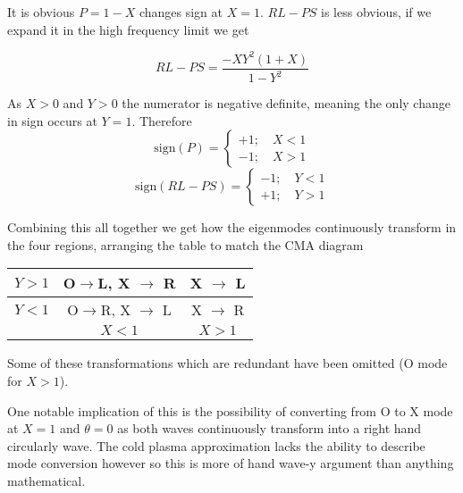 \documentclass[12pt, twoside]{article}
\begin{document}
	It is obvious $P = 1 - X$ changes sign at $X = 1$. $RL - PS$ is less obvious, if we expand it in the high frequency limit we get
	
	\begin{equation}
		RL - PS = \frac{-X Y^2 \left(1 + X\right)}{1 - Y^2}
	\end{equation}

	As $X > 0$ and $Y > 0$ the numerator is negative definite, meaning the only change in sign occurs at $Y = 1$. Therefore
	\begin{equation}
		\text{sign} \left(P\right) = \begin{cases}
			+1; \quad X < 1 \\ -1; \quad X > 1
		\end{cases}
	\end{equation}
	\begin{equation}
		\text{sign} \left(RL - PS\right) = \begin{cases}
			-1; \quad Y < 1 \\ +1; \quad Y > 1
		\end{cases}
	\end{equation}

	Combining this all together we get how the eigenmodes continuously transform in the four regions, arranging the table to match the CMA diagram
	\begin{center}
		\begin{tabular}{|c||c|c|}
			\hline $Y > 1$ & O$\rightarrow$L, X $\rightarrow$ R & X $\rightarrow$ L \\
			\hline $Y < 1$ & O$\rightarrow$R, X $\rightarrow$ L & X $\rightarrow$ R \\
			\hline \hline & $X < 1$ & $X > 1$ \\
			\hline
		\end{tabular}
	\end{center}

	Some of these transformations which are redundant have been omitted (O mode for $X > 1$).
	
	One notable implication of this is the possibility of converting from O to X mode at $X = 1$ and $\theta = 0$ as both waves continuously transform into a right hand circularly wave. The cold plasma approximation lacks the ability to describe mode conversion however so this is more of hand wave-y argument than anything mathematical.
\end{document}
